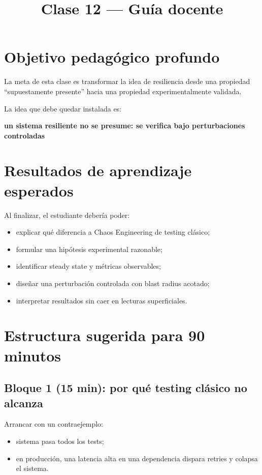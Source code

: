 \documentclass[variant=docente,cover=institutional,mode=screen]{ua-engineering-v6-article}
\title{Clase 12 --- Guía docente}
\author{\UAProfessor}
\date{\UADate}
\begin{document}
\maketitle

\section{Objetivo pedagógico profundo}

La meta de esta clase es transformar la idea de resiliencia desde una propiedad “supuestamente presente” hacia una propiedad experimentalmente validada.

La idea que debe quedar instalada es:

\begin{center}
\textbf{un sistema resiliente no se presume: se verifica bajo perturbaciones controladas}
\end{center}

\section{Resultados de aprendizaje esperados}

Al finalizar, el estudiante debería poder:

\begin{itemize}
\item explicar qué diferencia a Chaos Engineering de testing clásico;
\item formular una hipótesis experimental razonable;
\item identificar steady state y métricas observables;
\item diseñar una perturbación controlada con blast radius acotado;
\item interpretar resultados sin caer en lecturas superficiales.
\end{itemize}

\section{Estructura sugerida para 90 minutos}

\subsection*{Bloque 1 (15 min): por qué testing clásico no alcanza}
Arrancar con un contraejemplo:
\begin{itemize}
\item sistema pasa todos los tests;
\item en producción, una latencia alta en una dependencia dispara retries y colapsa el sistema.
\end{itemize}
\end{document}
